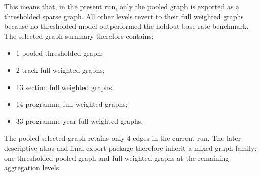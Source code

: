 This means that, in the present run, only the pooled graph is exported as a thresholded sparse graph. All other levels revert to their full weighted graphs because no thresholded model outperformed the holdout base-rate benchmark. The selected graph summary therefore contains:
\begin{itemize}
    \item 1 pooled thresholded graph;
    \item 2 track full weighted graphs;
    \item 13 section full weighted graphs;
    \item 14 programme full weighted graphs;
    \item 33 programme-year full weighted graphs.
\end{itemize}

The pooled selected graph retains only 4 edges in the current run. The later descriptive atlas and final export package therefore inherit a mixed graph family: one thresholded pooled graph and full weighted graphs at the remaining aggregation levels.
